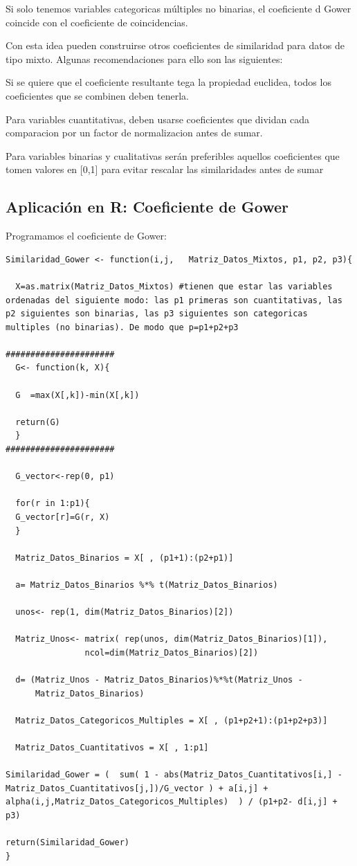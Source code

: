 \documentclass[12pt]{report} %
\begin{document}
Si solo tenemos variables categoricas múltiples no binarias,  el coeficiente d Gower coincide con el coeficiente de coincidencias.

\vspace{0.5cm}

Con esta idea pueden construirse otros coeficientes de similaridad para datos de tipo mixto. Algunas recomendaciones para ello son las siguientes:

Si se quiere que el coeficiente resultante tega la propiedad euclidea, todos los coeficientes que se combinen deben tenerla.

Para variables cuantitativas, deben usarse coeficientes que dividan cada comparacion por un factor de normalizacion antes de sumar.

Para variables binarias y cualitativas serán preferibles aquellos coeficientes que tomen valores en [0,1] para evitar rescalar las similaridades antes de sumar

\newpage

\subsection{Aplicación en R: Coeficiente de Gower }

Programamos el coeficiente de Gower:

\begin{lstlisting}
Similaridad_Gower <- function(i,j,   Matriz_Datos_Mixtos, p1, p2, p3){

  X=as.matrix(Matriz_Datos_Mixtos) #tienen que estar las variables ordenadas del siguiente modo: las p1 primeras son cuantitativas, las p2 siguientes son binarias, las p3 siguientes son categoricas multiples (no binarias). De modo que p=p1+p2+p3
  
###################### 
  G<- function(k, X){

  G  =max(X[,k])-min(X[,k])

  return(G)
  }
######################
  
  G_vector<-rep(0, p1)
  
  for(r in 1:p1){
  G_vector[r]=G(r, X)
  }
  
  Matriz_Datos_Binarios = X[ , (p1+1):(p2+p1)]
  
  a= Matriz_Datos_Binarios %*% t(Matriz_Datos_Binarios)
  
  unos<- rep(1, dim(Matriz_Datos_Binarios)[2])

  Matriz_Unos<- matrix( rep(unos, dim(Matriz_Datos_Binarios)[1]),      
                ncol=dim(Matriz_Datos_Binarios)[2])
                
  d= (Matriz_Unos - Matriz_Datos_Binarios)%*%t(Matriz_Unos -     
      Matriz_Datos_Binarios)   
  
  Matriz_Datos_Categoricos_Multiples = X[ , (p1+p2+1):(p1+p2+p3)]
  
  Matriz_Datos_Cuantitativos = X[ , 1:p1]
  
Similaridad_Gower = (  sum( 1 - abs(Matriz_Datos_Cuantitativos[i,] - Matriz_Datos_Cuantitativos[j,])/G_vector ) + a[i,j] + alpha(i,j,Matriz_Datos_Categoricos_Multiples)  ) / (p1+p2- d[i,j] + p3)
  
return(Similaridad_Gower)
}
\end{lstlisting}
\end{document}
